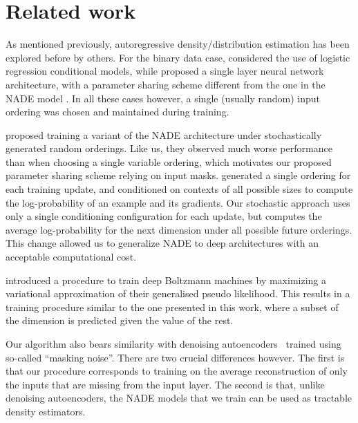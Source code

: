 \documentclass{article}
\begin{document}
\section{Related work}

As mentioned previously, autoregressive density/distribution
estimation has been explored before by others. For the binary data case,
\citet{Frey98} considered the use of logistic regression conditional models,
while \citet{bengio:2000:nips} proposed a single layer neural network architecture,
with a parameter sharing scheme different from the one in the
NADE model \citep{Larochelle+Murray-2011}. In all these cases however, a single (usually random)
input ordering was chosen and maintained during training.

\citet{GregorK2011} proposed training a variant of the NADE architecture under
stochastically generated random orderings.
Like us, they observed much worse performance than when choosing a single
variable ordering, which motivates our proposed parameter sharing scheme relying
on input masks.
\citeauthor{GregorK2011} generated a single ordering for
each training update, and conditioned on contexts of all possible sizes to compute
the log-probability of an example and its gradients.  Our stochastic approach
uses only a single conditioning configuration for each update,
but computes the average log-probability for the next dimension under all
possible future orderings. This change allowed us to generalize
NADE to deep architectures with an acceptable computational cost.

\citet{Goodfellow2013} introduced a procedure to train deep Boltzmann
machines by maximizing a variational approximation of their generalised pseudo
likelihood. This results in a training procedure similar to the one presented in
this work, where a subset of the dimension is predicted given the value of the
rest.

Our algorithm also bears similarity with denoising
autoencoders~\cite{VincentPLarochelleH2008} trained using so-called
``masking noise''. There are two crucial differences however. The
first is that our procedure corresponds to training on the
average reconstruction of only the inputs that are missing from the input
layer. The second is that, unlike denoising autoencoders, the NADE
models that we train can be used as tractable density estimators.
\end{document}
